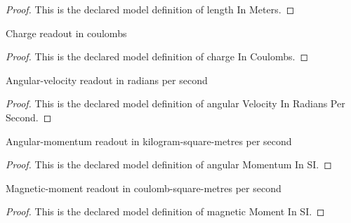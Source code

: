 \begin{proof}
  This is the declared model definition of length In Meters.
\end{proof}
\begin{definition}
  \label{def:physics:phyx-mini-0627:phyxminiproblems-problemphyxmini0627-chargeincoulombs}
  Charge readout in coulombs
\end{definition}
\begin{proof}
  This is the declared model definition of charge In Coulombs.
\end{proof}
\begin{definition}
  \label{def:physics:phyx-mini-0627:phyxminiproblems-problemphyxmini0627-angularvelocityinradianspersecond}
  Angular-velocity readout in radians per second
\end{definition}
\begin{proof}
  This is the declared model definition of angular Velocity In Radians Per Second.
\end{proof}
\begin{definition}
  \label{def:physics:phyx-mini-0627:phyxminiproblems-problemphyxmini0627-angularmomentuminsi}
  Angular-momentum readout in kilogram-square-metres per second
\end{definition}
\begin{proof}
  This is the declared model definition of angular Momentum In SI.
\end{proof}
\begin{definition}
  \label{def:physics:phyx-mini-0627:phyxminiproblems-problemphyxmini0627-magneticmomentinsi}
  Magnetic-moment readout in coulomb-square-metres per second
\end{definition}
\begin{proof}
  This is the declared model definition of magnetic Moment In SI.
\end{proof}
